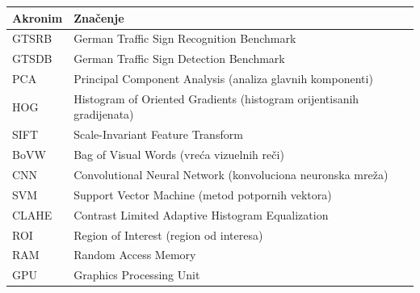 \documentclass[11pt,a4paper]{article}
\begin{document}
\begin{center}
\begin{tabular}{|l|p{10.5cm}|}
\hline
\textbf{Akronim} & \textbf{Značenje} \\
\hline
GTSRB & German Traffic Sign Recognition Benchmark \\
\hline
GTSDB & German Traffic Sign Detection Benchmark \\
\hline
PCA & Principal Component Analysis (analiza glavnih komponenti) \\
\hline
HOG & Histogram of Oriented Gradients (histogram orijentisanih gradijenata) \\
\hline
SIFT & Scale-Invariant Feature Transform \\
\hline
BoVW & Bag of Visual Words (vreća vizuelnih reči) \\
\hline
CNN & Convolutional Neural Network (konvoluciona neuronska mreža) \\
\hline
SVM & Support Vector Machine (metod potpornih vektora) \\
\hline
CLAHE & Contrast Limited Adaptive Histogram Equalization \\
\hline
ROI & Region of Interest (region od interesa) \\
\hline
RAM & Random Access Memory \\
\hline
GPU & Graphics Processing Unit \\
\hline
\end{tabular}
\end{center}
\end{document}
